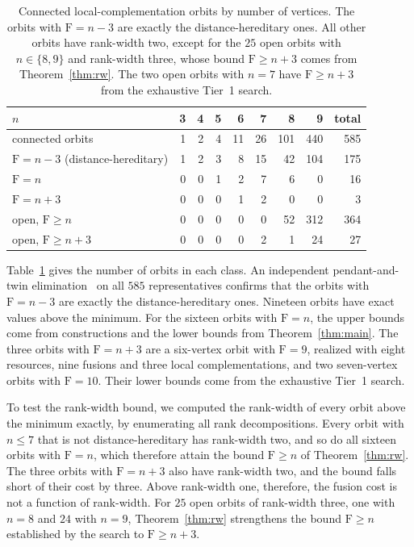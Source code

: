 \documentclass[aps,pra,onecolumn,superscriptaddress,nofootinbib,longbibliography]{revtex4-2}
\theoremstyle{plain}
\theoremstyle{remark}
\newcommand{\F}{\mathrm{F}}
\begin{document}
\begin{table}[t]
\centering
\begin{tabular}{lrrrrrrrr}
\toprule
$n$ & 3 & 4 & 5 & 6 & 7 & 8 & 9 & total\\
\midrule
connected orbits               & 1 & 2 & 4 & 11 & 26 & 101 & 440 & 585\\
$\F=n-3$ (distance-hereditary) & 1 & 2 & 3 &  8 & 15 &  42 & 104 & 175\\
$\F=n$                         & 0 & 0 & 1 &  2 &  7 &   6 &   0 &  16\\
$\F=n+3$                       & 0 & 0 & 0 &  1 &  2 &   0 &   0 &   3\\
open, $\F\ge n$                & 0 & 0 & 0 &  0 &  0 &  52 & 312 & 364\\
open, $\F\ge n+3$              & 0 & 0 & 0 &  0 &  2 &   1 &  24 &  27\\
\bottomrule
\end{tabular}
\caption{Connected local-complementation orbits by number of vertices. The orbits with $\F=n-3$ are
exactly the distance-hereditary ones. All other orbits have rank-width two, except for the $25$ open orbits
with $n\in\{8,9\}$ and rank-width three, whose bound $\F\ge n+3$ comes from Theorem~\ref{thm:rw}. The two
open orbits with $n=7$ have $\F\ge n+3$ from the exhaustive Tier~1 search.}
\label{tab:counts}
\end{table}

Table~\ref{tab:counts} gives the number of orbits in each class. An independent pendant-and-twin
elimination~\cite{Bandelt1986distance} on all $585$ representatives confirms that the orbits with $\F=n-3$ are exactly the distance-hereditary
ones. Nineteen orbits have exact values above the minimum. For the sixteen orbits with $\F=n$, the upper
bounds come from constructions and the lower bounds from Theorem~\ref{thm:main}. The three orbits with
$\F=n+3$ are a six-vertex orbit with $\F=9$, realized with eight resources, nine fusions and three local
complementations, and two seven-vertex orbits with $\F=10$. Their lower bounds come from the exhaustive
Tier~1 search.

To test the rank-width bound, we computed the rank-width of every orbit above the minimum exactly, by
enumerating all rank decompositions. Every orbit with $n\le 7$ that is not distance-hereditary has
rank-width two, and so do all sixteen orbits with $\F=n$, which therefore attain the bound $\F\ge n$ of
Theorem~\ref{thm:rw}. The three orbits with $\F=n+3$ also have rank-width two, and the bound falls short of
their cost by three. Above rank-width one, therefore, the fusion cost is not a function of rank-width. For
$25$ open orbits of rank-width three, one with $n=8$ and $24$ with $n=9$, Theorem~\ref{thm:rw} strengthens
the bound $\F\ge n$ established by the search to $\F\ge n+3$.
\end{document}
